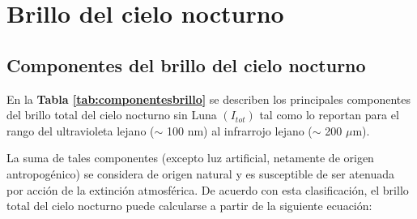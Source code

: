 \section{Brillo del cielo nocturno}
\label{sec:brillocielonocturno}

\subsection{Componentes del brillo del cielo nocturno}
\label{subsec:componentesbrillocielo}

En la \textbf{Tabla \ref{tab:componentesbrillo}} se describen los principales componentes del brillo total del cielo nocturno sin Luna $(I_{tot})$ tal como \cite{Leinert1998} lo reportan para el rango del ultravioleta lejano ($\sim$ 100 nm) al infrarrojo lejano ($\sim$ 200 $\mu$m).


\begin{table}[htb]
\centering
\caption{Componentes del brillo del cielo nocturno \citep{Leinert1998}}
\label{tab:componentesbrillo}
\end{table}

La suma de tales componentes (excepto luz artificial, netamente de origen antropogénico) se considera de origen natural y es susceptible de ser atenuada por acción de la extinción atmosférica. De acuerdo con esta clasificación, el brillo total del cielo nocturno puede calcularse a partir de la siguiente ecuación:

